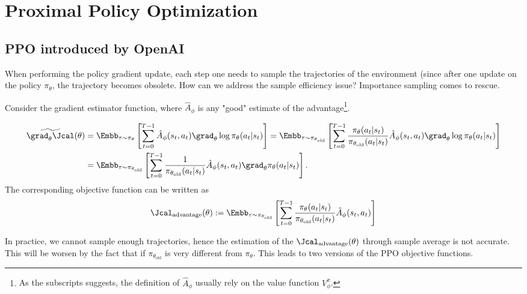 \section{Proximal Policy Optimization}

\subsection{PPO introduced by OpenAI}
When performing the policy gradient update, each step one needs to sample the trajectories of the environment (since after one update on the policy $\pi_\theta$, the trajectory becomes obsolete. How can we address the sample efficiency issue? Importance sampling comes to rescue.


Consider the gradient estimator function, where $\hat A_\phi$ is any "good" estimate of the advantage\footnote{As the subscripts suggests, the definition of $\hat A_\phi$ usually rely on the value function $V^{\pi}_{\phi}$. }.

\begin{align*}
   \widetilde{\grad_{\theta}\Jcal}(\theta)
   & =\Embb_{\tau\sim \pi_{\theta}}\left[ \sum_{t=0}^{T-1} \hat A_\phi(s_t,a_t)\grad_{\theta}\log\pi_{\theta}(a_t|s_t)\right] 
   =\Embb_{\tau\sim \pi_{\theta_{\text{old}}}}\left[ \sum_{t=0}^{T-1}\frac{\pi_{\theta}(a_t|s_t)}{\pi_{\theta_{\text{old}}}(a_t|s_t)} \hat A_\phi(s_t,a_t)\grad_{\theta}\log\pi_{\theta}(a_t|s_t)\right] \\
   & = \Embb_{\tau\sim \pi_{\theta_{\text{old}}}}\left[ \sum_{t=0}^{T-1}\frac{1}{\pi_{\theta_{\text{old}}}(a_t|s_t)} \hat A_\phi(s_t,a_t)\grad_{\theta}\pi_{\theta}(a_t|s_t)\right].
\end{align*}
The corresponding objective function can be written as 
\begin{align*}
   \Jcal_{\text{advantage}}(\theta):= \Embb_{\tau\sim \pi_{\theta_{\text{old}}}}\left[ \sum_{t=0}^{T-1}  \frac{\pi_{\theta}(a_t|s_t)}{\pi_{\theta_{\text{old}}}(a_t|s_t)}\hat A_\phi(s_t,a_t)\right] 
\end{align*}

In practice,  we cannot sample enough trajectories, hence the estimation of the $ \Jcal_{\text{advantage}}(\theta)$ through sample average is not accurate. This will be worsen by the fact that if $\pi_{\theta_{\text{old}}}$ is very different from $\pi_{\theta}$. This leads to two versions of the PPO objective functions.

